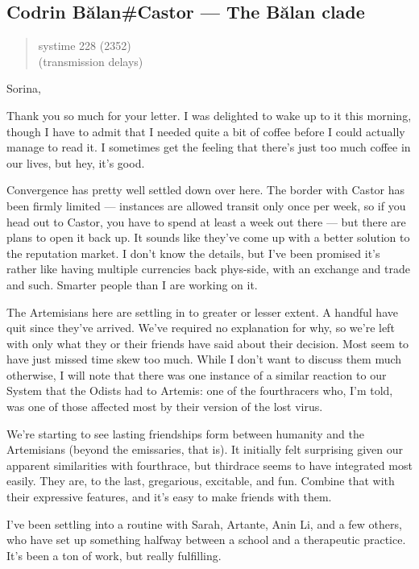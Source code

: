 \hypertarget{codrin-bux103lancastor-the-bux103lan-clade}{%
\subsection{Codrin Bălan\#Castor — The Bălan clade}\label{codrin-bux103lancastor-the-bux103lan-clade}}

\begin{quote}
systime 228 (2352)\\
(transmission delays)
\end{quote}

Sorina,

Thank you so much for your letter. I was delighted to wake up to it this morning, though I have to admit that I needed quite a bit of coffee before I could actually manage to read it. I sometimes get the feeling that there's just too much coffee in our lives, but hey, it's good.

Convergence has pretty well settled down over here. The border with Castor has been firmly limited — instances are allowed transit only once per week, so if you head out to Castor, you have to spend at least a week out there — but there are plans to open it back up. It sounds like they've come up with a better solution to the reputation market. I don't know the details, but I've been promised it's rather like having multiple currencies back phys-side, with an exchange and trade and such. Smarter people than I are working on it.

The Artemisians here are settling in to greater or lesser extent. A handful have quit since they've arrived. We've required no explanation for why, so we're left with only what they or their friends have said about their decision. Most seem to have just missed time skew too much. While I don't want to discuss them much otherwise, I will note that there was one instance of a similar reaction to our System that the Odists had to Artemis: one of the fourthracers who, I'm told, was one of those affected most by their version of the lost virus.

We're starting to see lasting friendships form between humanity and the Artemisians (beyond the emissaries, that is). It initially felt surprising given our apparent similarities with fourthrace, but thirdrace seems to have integrated most easily. They are, to the last, gregarious, excitable, and fun. Combine that with their expressive features, and it's easy to make friends with them.

I've been settling into a routine with Sarah, Artante, Anin Li, and a few others, who have set up something halfway between a school and a therapeutic practice. It's been a ton of work, but really fulfilling.

